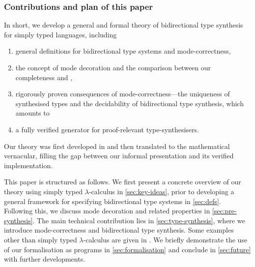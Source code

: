 \subsubsection{Contributions and plan of this paper}

%
In short, we develop a general and formal theory of bidirectional type synthesis for simply typed languages, including 
\begin{enumerate}
  \item general definitions for bidirectional type systems and mode-correctness,
  \item the concept of mode decoration and the comparison between our completeness and , 
  \item rigorously proven consequences of mode-correctness---the uniqueness of synthesised types and the decidability of bidirectional type synthesis, which amounts to
  \item a fully verified generator for proof-relevant type-synthesisers.
\end{enumerate}
Our theory was first developed in \Agda and then translated to the mathematical vernacular, filling the gap between our informal presentation and its verified implementation.


This paper is structured as follows.
We first present a concrete overview of our theory using simply typed $\lambda$-calculus in \cref{sec:key-ideas}, prior to developing a general framework for specifying bidirectional type systems in \cref{sec:defs}.
Following this, we discuss mode decoration and related properties in \cref{sec:pre-synthesis}.
The main technical contribution lies in \cref{sec:type-synthesis}, where we introduce mode-correctness and bidirectional type synthesis.
Some examples other than simply typed $\lambda$-calculus are given in .
We briefly demonstrate the use of our \Agda formalisation as programs in \cref{sec:formalisation} and conclude in \cref{sec:future} with further developments.


